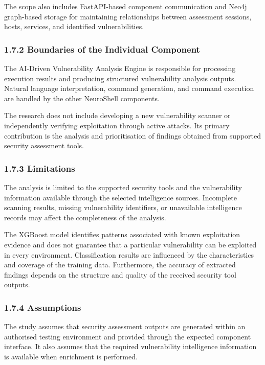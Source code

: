 \documentclass[
]{article}
\begin{document}
The scope also includes FastAPI-based component communication and Neo4j
graph-based storage for maintaining relationships between assessment
sessions, hosts, services, and identified vulnerabilities.

\hypertarget{boundaries-of-the-individual-component}{%
\subsubsection{1.7.2 Boundaries of the Individual
Component}\label{boundaries-of-the-individual-component}}

The AI-Driven Vulnerability Analysis Engine is responsible for
processing execution results and producing structured vulnerability
analysis outputs. Natural language interpretation, command generation,
and command execution are handled by the other NeuroShell components.

The research does not include developing a new vulnerability scanner or
independently verifying exploitation through active attacks. Its primary
contribution is the analysis and prioritisation of findings obtained
from supported security assessment tools.

\hypertarget{limitations}{%
\subsubsection{1.7.3 Limitations}\label{limitations}}

The analysis is limited to the supported security tools and the
vulnerability information available through the selected intelligence
sources. Incomplete scanning results, missing vulnerability identifiers,
or unavailable intelligence records may affect the completeness of the
analysis.

The XGBoost model identifies patterns associated with known exploitation
evidence and does not guarantee that a particular vulnerability can be
exploited in every environment. Classification results are influenced by
the characteristics and coverage of the training data. Furthermore, the
accuracy of extracted findings depends on the structure and quality of
the received security tool outputs.

\hypertarget{assumptions}{%
\subsubsection{1.7.4 Assumptions}\label{assumptions}}

The study assumes that security assessment outputs are generated within
an authorised testing environment and provided through the expected
component interface. It also assumes that the required vulnerability
intelligence information is available when enrichment is performed.
\end{document}
